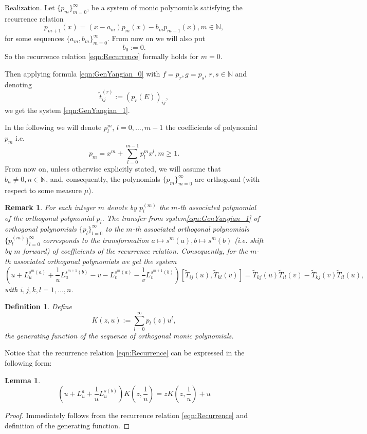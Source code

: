 \documentclass[10pt]{article}%
\numberwithin{equation}{section}
\newtheorem{lem}[thm]{Lemma}
\newtheorem{defin}[thm]{Definition}
\newtheorem{rem}[thm]{Remark}
\begin{document}
\begin{paragraph}{Realization.}
Let $\{p_m\}_{m=0}^{\infty}$, be a system of monic polynomials satisfying the recurrence relation
\begin{equation}\label{eqn:Recurrence}
p_{m+1}(x)=(x-a_m)p_m(x)-b_m p_{m-1}(x), m\in \mathbb{N},
\end{equation}
for some sequences $\{a_m,b_m\}_{m=0}^{\infty}$. From now on we will also put
\begin{equation}\label{eqn:abInitCondition}
b_0:=0.
\end{equation}
So the recurrence relation \eqref{eqn:Recurrence} formally holds for $m=0$. 

Then applying formula \eqref{eqn:GenYangian_0} with $f=p_r, g=p_s$, $r,s\in \mathbb{N}$ and denoting
\[
\tilde{t}_{ij}^{(r)}:=(p_r(E))_{ij},
\]
we get the system \eqref{eqn:GenYangian_1}.

In the following we will denote $p_l^m$, $l=0, \ldots, m-1$ the coefficients of polynomial $p_m$ i.e.
\[
p_m=x^m+\sum\limits_{l=0}^{m-1}p_l^m x^l,m\geq 1.
\]
From now on, unless otherwise explicitly stated, we will assume that $b_n\neq 0, n\in \mathbb{N}$, and, consequently, the polynomials $\{p_m\}_{m=0}^{\infty}$ are orthogonal (with respect to some measure $\mu$).
\begin{rem} For each integer $m$ denote by $p_l^{(m)}$ the $m$-th associated  polynomial of the orthogonal polynomial $p_l$. The
transfer from  system\eqref{eqn:GenYangian_1}  of orthogonal polynomials $\{p_l\}_{l=0}^{\infty}$ to the $m$-th associated orthogonal polynomials $\{p_l^{(m)}\}_{l=0}^{\infty}$ corresponds to the transformation $a\mapsto s^{m}(a), b\mapsto s^{m}(b)$ (i.e. shift by $m$ forward) of coefficients of the recurrence relation. Consequently, for the $m$-th associated orthogonal polynomials we get the system
\begin{equation}\label{eqn:GenYangian_2Ass}
\left(u+L^{s^m(a)}_u+\frac{1}{u}L^{s^{m+1}(b)}_u-v-L^{s^m(a)}_v-\frac{1}{v}L^{s^{m+1}(b)}_v\right)[\tilde{T}_{ij}(u),\tilde{T}_{kl}(v)]=\tilde{T}_{kj}(u)\tilde{T}_{il}(v)-\tilde{T}_{kj}(v)\tilde{T}_{il}(u),
\end{equation}
with $i,j,k,l=1,\ldots,n$.
\end{rem}
\begin{defin}
    Define
    \[
    K(z,u):=\sum\limits_{l=0}^{\infty}p_l(z)u^l,
    \]
   the generating function of the sequence of orthogonal monic polynomials.
\end{defin}
Notice that the recurrence relation \eqref{eqn:Recurrence} can be expressed in the following form:
\begin{lem}
\begin{equation}\label{eqn:GenFunctionPol_1}
    \left(u+L^a_u+\frac{1}{u}L^{s(b)}_u\right) K(z,\frac{1}{u})=z K(z,\frac{1}{u})+u 
\end{equation}
\end{lem}
\begin{proof}
    Immediately follows from the recurrence relation \eqref{eqn:Recurrence} and definition of the generating function.
\end{proof}


\end{paragraph}
\end{document}
